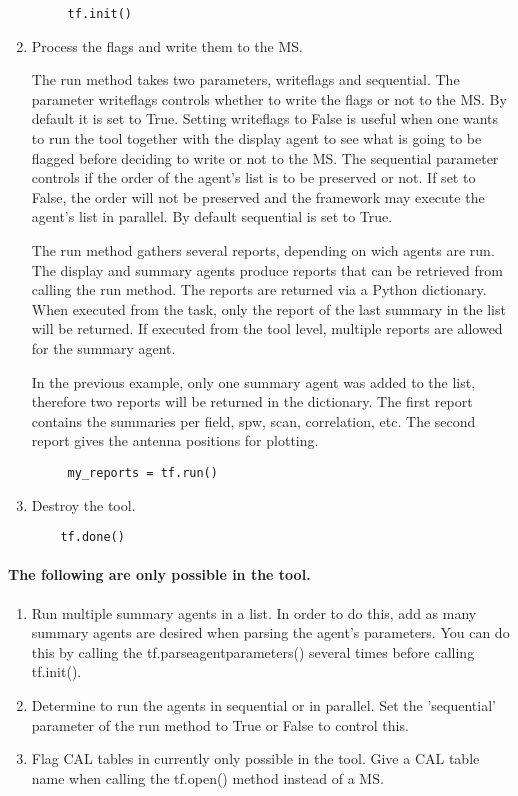 \begin{enumerate}
\begin{verbatim}
     tf.init()
\end{verbatim}

\item Process the flags and write them to the MS.

The run method takes two parameters, writeflags and sequential.
The parameter writeflags controls whether to write the flags or not to the MS.
By default it is set to True. Setting writeflags to False is useful when one
wants to run the tool together with the display agent to see what is going to be
flagged before deciding to write or not to the MS. The sequential parameter
controls if the order of the agent's list is to be preserved or not. If set to
False, the order will not be preserved and the framework may execute the agent's list in parallel.
By default sequential is set to True.

The run method gathers several reports, depending on wich agents are run. The display and summary agents
produce reports that can be retrieved from calling the run method. The reports are returned via a Python
dictionary. When executed from the task, only the report of the
last summary in the list will be returned. If executed from the tool level,
multiple reports are allowed for the summary agent.

In the previous example, only one summary agent was added to the list, therefore
two reports will be returned in the dictionary. The first report contains the
summaries per field, spw, scan, correlation, etc. The second report
gives the antenna positions for plotting.

\begin{verbatim}
     my_reports = tf.run()
\end{verbatim}

\item Destroy the tool.

\begin{verbatim}
    tf.done()
\end{verbatim}
 \end{enumerate}
 
\paragraph{The following are only possible in the tool.}
\begin{enumerate}

\item Run multiple summary agents in a list. In order to do this, add as many
summary agents are desired when parsing the agent's parameters. You can do this by
calling the tf.parseagentparameters() several times before calling tf.init().

\item Determine to run the agents in sequential or in parallel. Set the
'sequential' parameter of the run method to True or False to control this.

\item Flag CAL tables in currently only possible in the tool. Give a CAL table
name when calling the tf.open() method instead of a MS.
\end{enumerate}

